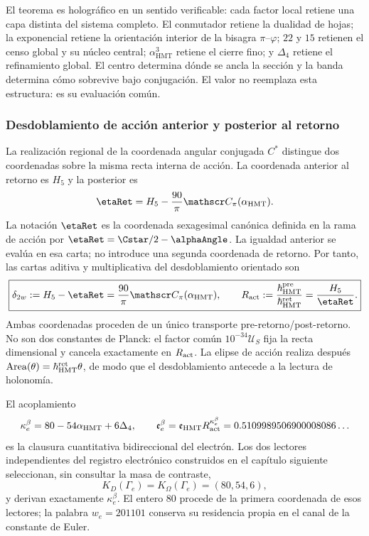 El teorema es holográfico en un sentido verificable: cada factor local
retiene una capa distinta del sistema completo. El conmutador retiene la
dualidad de hojas; la exponencial retiene la orientación interior de la
bisagra \(\pi\)--\(\varphi\); \(22\) y \(15\) retienen el censo global y
su núcleo central; \(\alpha_{\mathrm{HMT}}^3\) retiene el cierre fino; y
\(\Delta_4\) retiene el refinamiento global. El centro determina dónde se
ancla la sección y la banda determina cómo sobrevive bajo conjugación.
El valor no reemplaza esta estructura: es su evaluación común.

\subsubsection{Desdoblamiento de acción anterior y posterior al retorno}
\label{sec:electron-desdoblamiento-two-way-rev9}

La realización regional de la coordenada angular conjugada \(C^*\) distingue dos coordenadas sobre la
misma recta interna de acción. La coordenada anterior al retorno es \(H_5\) y
la posterior es
\[
\etaRet
 =H_5-\frac{90}{\pi}\mathscr C_\pi(\alpha_{\rm HMT}).
\]
La notación \(\etaRet\) es la coordenada sexagesimal canónica definida en la
rama de acción por \(\etaRet=\Cstar/2-\alphaAngle\). La igualdad anterior se
evalúa en esa carta; no introduce una segunda coordenada de retorno.
Por tanto, las cartas aditiva y multiplicativa del desdoblamiento orientado
son
\begin{equation}
 \boxed{
 \delta_{2w}:=H_5-\etaRet
 =\frac{90}{\pi}\mathscr C_\pi(\alpha_{\rm HMT}),
 \qquad
 R_{\rm act}:=\frac{\hbar^{\rm pre}_{\rm HMT}}
 {\hbar^{\rm ret}_{\rm HMT}}
 =\frac{H_5}{\etaRet}.}
 \label{eq:electron-desdoblamiento-two-way-rev9}
\end{equation}
Ambas coordenadas proceden de un único transporte pre-retorno/post-retorno.
No son dos constantes de Planck: el factor común
\(10^{-34}\mathcal U_S\) fija la recta dimensional y cancela exactamente en
\(R_{\rm act}\). La elipse de acción realiza después
\(\operatorname{Area}(\theta)=\hbar_{\rm HMT}^{\rm ret}\theta\), de modo que
el desdoblamiento antecede a la lectura de holonomía.

El acoplamiento
\begin{equation}
 \kappa_e^{\beta}
 =80-54\alpha_{\rm HMT}+6\Delta_4,
 \qquad
 \mathfrak e_e^{\beta}
 =\mathfrak e_{\rm HMT}R_{\rm act}^{\kappa_e^{\beta}}
 =0.5109989506900008086\ldots
 \label{eq:electron-beta-two-way-rev9}
\end{equation}
es la clausura cuantitativa bidireccional del electrón. Los dos lectores
independientes del registro electrónico construidos en el capítulo siguiente
seleccionan, sin consultar la masa de contraste,
\[
 K_D(\Gamma_e)=K_\Omega(\Gamma_e)=(80,54,6),
\]
y derivan exactamente \(\kappa_e^\beta\). El entero \(80\) procede de la
primera coordenada de esos lectores; la palabra \(w_e=201101\) conserva su
residencia propia en el canal de la constante de Euler.

